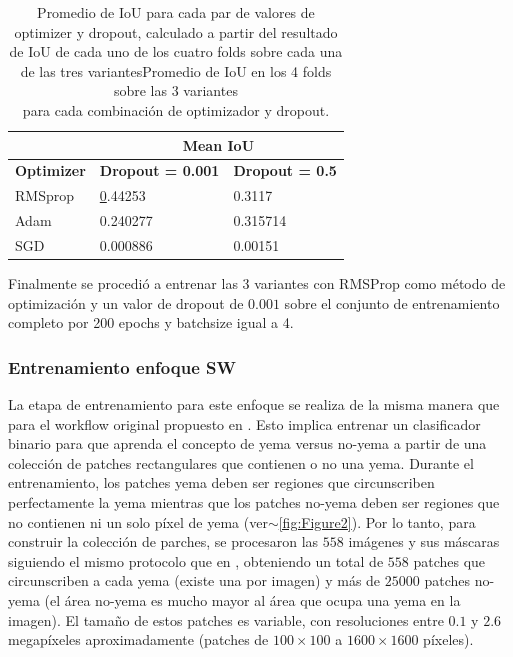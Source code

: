 \documentclass[a4paper,authoryear,review]{elsarticle}
\begin{document}
	\begin{table}[]
		\centering
		\begin{tabular}{lll}
			\hline
			\multicolumn{1}{|l|}{} & \multicolumn{2}{c|}{\textbf{Mean IoU}} \\ \hline
			\multicolumn{1}{|c|}{\textbf{Optimizer}} & \multicolumn{1}{c|}{\textbf{Dropout = 0.001}} & \multicolumn{1}{c|}{\textbf{Dropout = 0.5}} \\ \hline
			RMSprop & {\ul 0.44253} & 0.3117 \\
			Adam & 0.240277 & 0.315714 \\
			SGD & 0.000886 & 0.00151 \\ \hline
		\end{tabular}%
		\caption{Promedio de IoU para cada par de valores de optimizer y dropout, calculado a partir del resultado de IoU de cada uno de los cuatro folds sobre cada una de las tres variantesPromedio de IoU en los 4 folds sobre las $3$ variantes \\
			para cada combinación de optimizador y dropout.}
		\label{tab:TablaX}
	\end{table}
	
	
	Finalmente se procedió a entrenar las 3 variantes con RMSProp como método de optimización y un valor de dropout de $0.001$ sobre el conjunto de entrenamiento completo por 200 epochs y batchsize igual a 4.
	
	\subsubsection{Entrenamiento enfoque SW} 
	\label{sec:swtrain}
	
	
	La etapa de entrenamiento para este enfoque se realiza de la misma manera que para el workflow original propuesto en \citet{perez2017image}. Esto implica entrenar un clasificador binario para que aprenda el concepto de yema versus no-yema a partir de una colección de patches rectangulares que contienen o no una yema. Durante el entrenamiento, los patches yema deben ser regiones que circunscriben perfectamente la yema mientras que los  patches no-yema deben ser regiones que no contienen ni un solo píxel de yema (ver$\sim$\ref{fig:Figure2}). Por lo tanto, para construir la colección de parches, se procesaron las $558$ imágenes y sus máscaras siguiendo el mismo protocolo que en \citet{perez2017image}, obteniendo un total de $558$ patches que circunscriben a cada yema (existe una por imagen) y más de $25000$ patches no-yema (el área no-yema es mucho mayor al área que ocupa una yema en la imagen). El tamaño de estos patches es variable, con resoluciones entre $0.1$ y $2.6$ megapíxeles aproximadamente (patches de $100 \times 100$ a $1600 \times 1600$ píxeles).
	
\end{document}

